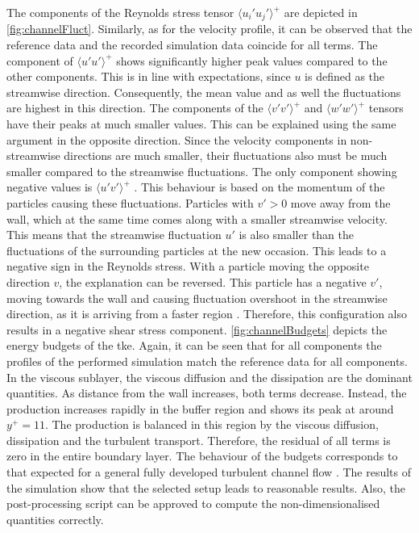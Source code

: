 The components of the Reynolds stress tensor $\langle u_i'u_j'\rangle ^+$ are depicted in \autoref{fig:channelFluct}.
Similarly, as for the velocity profile, it can be observed that the reference data and the recorded simulation data coincide for all terms.
The component of $\langle u'u'\rangle ^+$ shows significantly higher peak values compared to the other components.
This is in line with expectations, since $u$ is defined as the streamwise direction.
Consequently, the mean value and as well the fluctuations are highest in this direction.
The components of the $\langle v'v'\rangle ^+$ and $\langle w'w'\rangle ^+$ tensors have their peaks at much smaller values.
%
This can be explained using the same argument in the opposite direction.
Since the velocity components in non-streamwise directions are much smaller, their fluctuations also must be much smaller compared to the streamwise fluctuations.
The only component showing negative values is $\langle u'v'\rangle ^+$ .
This behaviour is based on the momentum of the particles causing these fluctuations.
Particles with $v' > 0$ move away from the wall, which at the same time comes along with a smaller streamwise velocity. This means that the streamwise fluctuation $u'$ is also smaller than the fluctuations of the surrounding particles at the new occasion.
This leads to a negative sign in the Reynolds stress.
With a particle moving the opposite direction $v$, the explanation can be reversed.
This particle has a negative $v'$, moving towards the wall and causing fluctuation overshoot in the streamwise direction, as it is arriving from a faster region \citep{tennekes_first_1972}.
Therefore, this configuration also results in a negative shear stress component.
\autoref{fig:channelBudgets} depicts the energy budgets of the \acrshort{tke}.
Again, it can be seen that for all components the profiles of the performed simulation match the reference data for all components.
In the viscous sublayer, the viscous diffusion and the dissipation are the dominant quantities.
As distance from the wall increases, both terms decrease.
Instead, the production increases rapidly in the buffer region and shows its peak at around $y ^+ = 11$.
The production is balanced in this region by the viscous diffusion, dissipation and the turbulent transport.
Therefore, the residual of all terms is zero in the entire boundary layer.
The behaviour of the budgets corresponds to that expected for a general fully developed turbulent channel flow \citep{mansour_reynolds-stress_1988}.
The results of the simulation show that the selected setup leads to reasonable results.
Also, the post-processing script can be approved to compute the non-dimensionalised quantities correctly.



